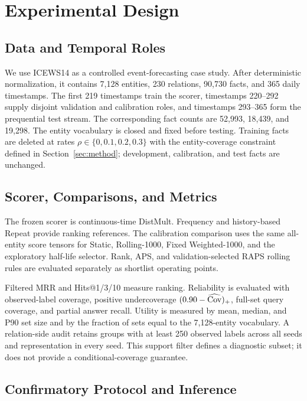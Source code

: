 \section{Experimental Design}
\label{sec:experiments}

\subsection{Data and Temporal Roles}

We use ICEWS14 as a controlled event-forecasting case study. After deterministic
normalization, it contains 7,128 entities, 230 relations, 90,730 facts, and 365
daily timestamps. The first 219 timestamps train the scorer, timestamps
220--292 supply disjoint validation and calibration roles, and timestamps
293--365 form the prequential test stream. The corresponding fact counts are
52,993, 18,439, and 19,298. The entity vocabulary is closed and fixed before
testing. Training facts are deleted at rates
\(\rho\in\{0,0.1,0.2,0.3\}\) with the entity-coverage constraint defined in
Section~\ref{sec:method}; development, calibration, and test facts are unchanged.

\subsection{Scorer, Comparisons, and Metrics}

The frozen scorer is continuous-time DistMult. Frequency and history-based
Repeat provide ranking references. The calibration comparison uses the same
all-entity score tensors for Static, Rolling-1000, Fixed Weighted-1000, and the
exploratory half-life selector. Rank, APS, and validation-selected RAPS rolling
rules are evaluated separately as shortlist operating points.

Filtered MRR and Hits@1/3/10 measure ranking. Reliability is evaluated with
observed-label coverage, positive undercoverage
\((0.90-\widehat{\operatorname{Cov}})_+\), full-set query coverage, and partial answer recall.
Utility is measured by mean, median, and P90 set size and by the fraction of
sets equal to the 7,128-entity vocabulary. A relation-side audit retains groups
with at least 250 observed labels across all seeds and representation in every
seed. This support filter defines a diagnostic subset; it does not provide a
conditional-coverage guarantee.

\subsection{Confirmatory Protocol and Inference}

